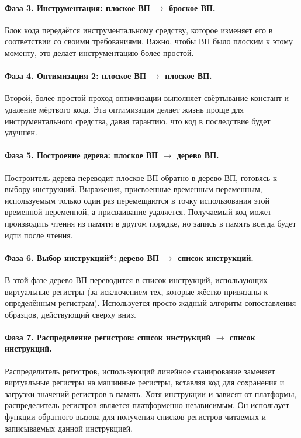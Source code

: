 \documentclass[a4paper,12pt,russian]{article}
\begin{document}
\paragraph{Фаза 3. Инструментация: плоское ВП $\to$ броское ВП.}
Блок кода передаётся инструментальному средству, которое изменяет его в соответствии со своими требованиями. Важно, чтобы ВП было плоским к этому моменту, это делает инструментацию более простой.

\paragraph{Фаза 4. Оптимизация 2: плоское ВП $\to$ плоское ВП.}
Второй, более простой проход оптимизации выполняет свёртывание констант и удаление мёртвого кода. Эта оптимизация делает жизнь проще для инструментального средства, давая гарантию, что код в последствие будет улучшен.

\paragraph{Фаза 5. Построение дерева: плоское ВП $\to$ дерево ВП.}
Построитель дерева переводит плоское ВП обратно в дерево ВП, готовясь к выбору инструкций. Выражения, присвоенные временным переменным, используемым только один раз перемещаются в точку использования этой временной переменной, а присваивание удаляется. Получаемый код может производить чтения из памяти в другом порядке, но запись в память всегда будет идти после чтения.

\paragraph{Фаза 6. Выбор инструкций*: дерево ВП $\to$ список инструкций.}
В этой фазе дерево ВП переводится в список инструкций, использующих виртуальные регистры (за исключением тех, которые жёстко привязаны к определённым регистрам). Используется просто жадный алгоритм сопоставления образцов, действующий сверху вниз.

\paragraph{Фаза 7. Распределение регистров: список инструкций $\to$ список инструкций.}
Распределитель регистров, использующий линейное сканирование заменяет виртуальные регистры на машинные регистры, вставляя код для сохранения и загрузки значений регистров в память.
Хотя инструкции и зависят от платформы, распределитель регистров является платформенно-независимым.
Он использует функции обратного вызова для получения списков регистров читаемых и записываемых данной инструкцией.
\end{document}
